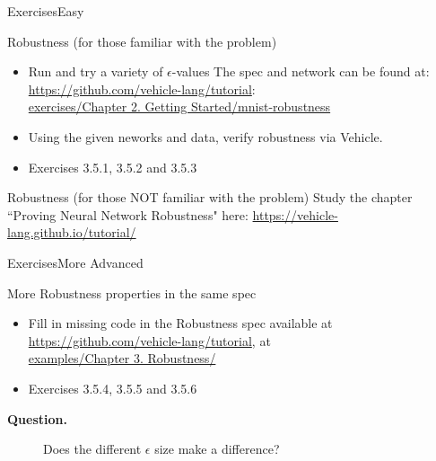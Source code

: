 \documentclass[t,compress,aspectratio=169]{beamer}
\newcommand{\question}[1]{\begin{description}
		\item[\textbf{Question.}] #1
\end{description}}
\begin{document}
\begin{frame}{Exercises}{Easy}


\begin{block}{Robustness (for those familiar with the problem)}
\footnotesize{
\begin{itemize}
\item Run and try a variety of $\epsilon$-values
The spec and network can be found at:
\url{https://github.com/vehicle-lang/tutorial}:\\
\url{exercises/Chapter 2. Getting Started/mnist-robustness}

\item Using the given neworks and data, verify robustness via Vehicle.
\item \textcolor{aisecred}{Exercises 3.5.1, 3.5.2 and 3.5.3}
\end{itemize}}
\end{block}

\begin{alertblock}{Robustness (for those NOT familiar with the problem)}
\footnotesize{Study the chapter ``Proving Neural Network Robustness" here: \url{https://vehicle-lang.github.io/tutorial/}}
\end{alertblock}
\end{frame}

\begin{frame}{Exercises}{More Advanced}

\begin{block}{More Robustness properties in the same spec}

\begin{itemize}
\item Fill in missing code in the Robustness spec available at
\url{https://github.com/vehicle-lang/tutorial}, at \\
\url{examples/Chapter 3. Robustness/}
 \item \textcolor{aisecred}{Exercises 3.5.4, 3.5.5 and 3.5.6}
\end{itemize}
\end{block}
\question{Does the different $\epsilon$ size make a difference?}
\end{frame}
\end{document}
